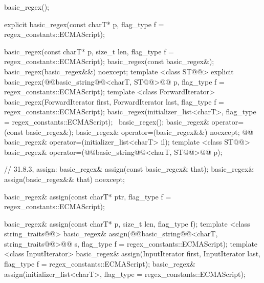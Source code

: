 \documentclass[ebook,11pt,article]{memoir}
\begin{document}
\begin{codeblock}
    basic_regex();
\end{codeblock}
\begin{removedblock}
\begin{codeblock}
    explicit basic_regex(const charT* p,
      flag_type f = regex_constants::ECMAScript);
\end{codeblock}
\end{removedblock}
\begin{codeblock}                          
    basic_regex(const charT* p, size_t len, flag_type f = regex_constants::ECMAScript);
    basic_regex(const basic_regex&);
    basic_regex(basic_regex&&) noexcept;
    template <class ST@@>
      explicit basic_regex(@@basic_string@@<charT, ST@@>@\removed{\&}@ p, 
                           flag_type f = regex_constants::ECMAScript);
    template <class ForwardIterator>
      basic_regex(ForwardIterator first, ForwardIterator last, 
                  flag_type f = regex_constants::ECMAScript);
    basic_regex(initializer_list<charT>,
      flag_type = regex_constants::ECMAScript);
    ~basic_regex();
    basic_regex& operator=(const basic_regex&);
    basic_regex& operator=(basic_regex&&) noexcept;
    @@
    basic_regex& operator=(initializer_list<charT> il);
    template <class ST@@>
      basic_regex& operator=(@@basic_string@@<charT, ST@@>@\removed{\&}@ p);

    // 31.8.3, assign:
    basic_regex& assign(const basic_regex& that);
    basic_regex& assign(basic_regex&& that) noexcept;
\end{codeblock}
\begin{removedblock}
\begin{codeblock}
    basic_regex& assign(const charT* ptr,
      flag_type f = regex_constants::ECMAScript);
\end{codeblock}
\end{removedblock}
\begin{codeblock}                          
    basic_regex& assign(const charT* p, size_t len, flag_type f);
    template <class string_traits@@>
      basic_regex& assign(@@basic_string@@<charT, string_traits@@>@\removed{\&}@ s,
                          flag_type f = regex_constants::ECMAScript);
    template <class InputIterator>
      basic_regex& assign(InputIterator first, InputIterator last,
                          flag_type f = regex_constants::ECMAScript);
    basic_regex& assign(initializer_list<charT>,
                        flag_type = regex_constants::ECMAScript);
\end{codeblock}
\end{document}
